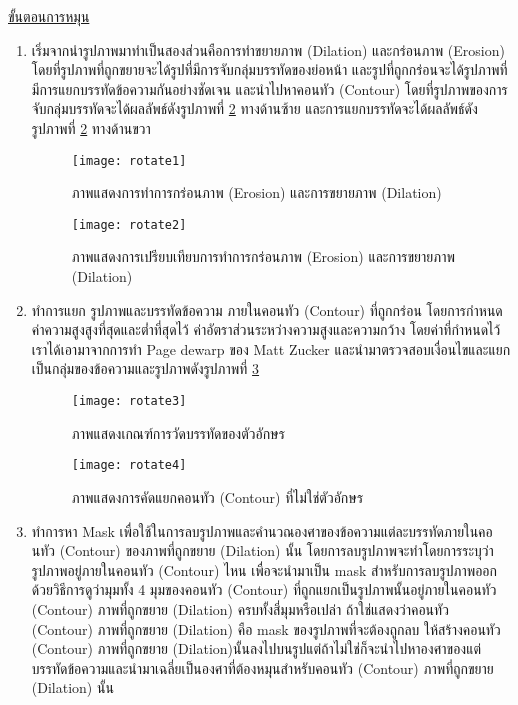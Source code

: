 \underline{ขั้นตอนการหมุน}

\begin{enumerate}
    \item เริ่มจากนำรูปภาพมาทำเป็นสองส่วนคือการทำขยายภาพ (Dilation) และกร่อนภาพ (Erosion) 
    โดยที่รูปภาพที่ถูกขยายจะได้รูปที่มีการจับกลุ่มบรรทัดของย่อหน้า และรูปที่ถูกกร่อนจะได้รูปภาพที่มีการแยกบรรทัดข้อความกันอย่างชัดเจน และนำไปหาคอนทัว 
    (Contour) โดยที่รูปภาพของการจับกลุ่มบรรทัดจะได้ผลลัพธ์ดังรูปภาพที่ \ref{fig:rotate2} ทางด้านซ้าย และการแยกบรรทัดจะได้ผลลัพธ์ดังรูปภาพที่ \ref{fig:rotate2} ทางด้านขวา 
    
    \begin{figure}[H]
        \centering
        \texttt{[image: rotate1]}
        \caption{ภาพแสดงการทำการกร่อนภาพ (Erosion) และการขยายภาพ (Dilation)}\label{fig:rotate1}
    \end{figure}
    
    \begin{figure}[H]
        \centering
        \texttt{[image: rotate2]}
        \caption{ภาพแสดงการเปรียบเทียบการทำการกร่อนภาพ (Erosion) และการขยายภาพ (Dilation)}\label{fig:rotate2}
    \end{figure}

    \item ทำการแยก รูปภาพและบรรทัดข้อความ ภายในคอนทัว (Contour) ที่ถูกกร่อน โดยการกำหนดค่าความสูงสูงที่สุดและต่ำที่สุดไว้ 
    ค่าอัตราส่วนระหว่างความสูงและความกว้าง โดยค่าที่กำหนดไว้เราได้เอามาจากการทำ Page dewarp ของ Matt Zucker \cite{mattzuck} 
    และนำมาตรวจสอบเงื่อนไขและแยกเป็นกลุ่มของข้อความและรูปภาพดังรูปภาพที่ \ref{fig:rotate3}
    
    \begin{figure}[H]
        \centering
        \texttt{[image: rotate3]}
        \caption{ภาพแสดงเกณฑ์การวัดบรรทัดของตัวอักษร}\label{fig:rotate3}
    \end{figure}
    
    \begin{figure}[H]
        \centering
        \texttt{[image: rotate4]}
        \caption{ภาพแสดงการคัดแยกคอนทัว (Contour) ที่ไม่ใช่ตัวอักษร}\label{fig:rotate4}
    \end{figure}

    \item ทำการหา Mask เพื่อใช้ในการลบรูปภาพและคำนวณองศาของข้อความแต่ละบรรทัดภายในคอนทัว (Contour) ของภาพที่ถูกขยาย (Dilation) นั้น 
    โดยการลบรูปภาพจะทำโดยการระบุว่ารูปภาพอยู่ภายในคอนทัว (Contour) ไหน เพื่อจะนำมาเป็น mask สำหรับการลบรูปภาพออกด้วยวิธีการดูว่ามุมทั้ง 4 มุมของคอนทัว 
    (Contour) ที่ถูกแยกเป็นรูปภาพนั้นอยู่ภายในคอนทัว (Contour) ภาพที่ถูกขยาย (Dilation) ครบทั้งสี่มุมหรือเปล่า ถ้าใช่แสดงว่าคอนทัว (Contour) ภาพที่ถูกขยาย (Dilation)
     คือ mask ของรูปภาพที่จะต้องถูกลบ ให้สร้างคอนทัว (Contour) ภาพที่ถูกขยาย (Dilation)นั้นลงไปบนรูปแต่ถ้าไม่ใช่ก็จะนำไปหาองศาของแต่บรรทัดข้อความและนำมาเฉลี่ยเป็นองศาที่ต้องหมุนสำหรับคอนทัว 
     (Contour) ภาพที่ถูกขยาย (Dilation) นั้น
    

\end{enumerate}
